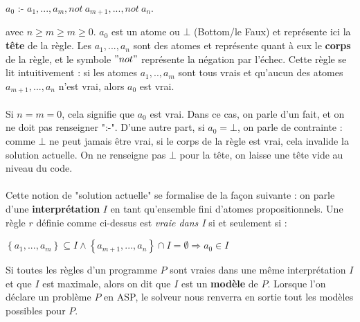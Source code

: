 \documentclass[12pt,a4paper]{article}
\begin{document}
\begin{center}
$a_0$ :- $a_1,...,a_m,not \: a_{m+1},...,not \: a_n.$
\end{center}
avec $n\geq m\geq m\geq 0$. $a_0$ est un atome ou $\bot$ (Bottom/le Faux) et représente ici la \textbf{tête} de la règle. Les $a_1,...,a_n$ sont des atomes et représente quant à eux le \textbf{corps} de la règle, et le symbole $"not"$ 
représente la négation par l'échec. Cette règle se lit intuitivement : si les atomes $a_1,..,a_m$ sont tous vrais et qu'aucun des atomes $a_{m+1},...,a_n$ n'est vrai, alors $a_0$ est vrai.\\ \\
Si $n=m=0$, cela signifie que $a_0$ est vrai. Dans ce cas, on parle d'un fait, et on ne doit pas renseigner ":-". D'une autre part, si $a_0=\bot$, on parle de contrainte : comme $\bot$ ne peut jamais être vrai, si le corps de la 
règle est vrai, cela 
invalide la solution actuelle. On ne renseigne pas $\bot$ pour la tête, on laisse une tête vide au niveau du code.\\ \\
Cette notion de "solution actuelle" se formalise de la façon suivante : on parle d'une \textbf{interprétation} $I$ en tant qu'ensemble fini d'atomes propositionnels. Une règle $r$ définie comme ci-dessus est \emph{vraie dans I} si 
et seulement si :

\begin{center}
$\left\{a_1,...,a_m\right\}\subseteq I \wedge \left\{a_{m+1},...,a_n\right\} \cap I = \emptyset \Rightarrow a_0 \in I$
\end{center}

Si toutes les règles d'un programme $P$ sont vraies dans une même interprétation $I$ et que $I$ est maximale, alors on dit que $I$ est un \textbf{modèle} de $P$. Lorsque l'on déclare un problème $P$ en ASP, le solveur nous renverra en sortie tout 
les modèles possibles pour $P$.
\end{document}
